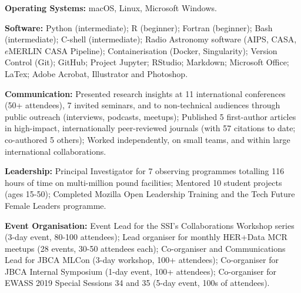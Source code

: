  \vspace{-8pt}
\begin{cvpubs}
  \cvpub
    {
      \begin{cvlist}
        \item{\textbf{Operating Systems:} macOS, Linux, Microsoft Windows.}
        \item {\textbf{Software:} Python (intermediate); R (beginner); Fortran (beginner); Bash (intermediate); C-shell (intermediate); Radio Astronomy software (AIPS, CASA, $e$MERLIN CASA Pipeline); Containerisation (Docker, Singularity); Version Control (Git); GitHub; Project Jupyter; RStudio; Markdown; Microsoft Office; LaTex; Adobe Acrobat, Illustrator and Photoshop.}
        \item {\textbf{Communication:} Presented research insights at 11 international conferences (50+ attendees), 7 invited seminars, and to non-technical audiences through public outreach (interviews, podcasts, meetups); Published 5 first-author articles in high-impact, internationally peer-reviewed journals (with 57 citations to date; co-authored 5 others); Worked independently, on small teams, and within large international collaborations.}
        \item {\textbf{Leadership:} Principal Investigator for 7 observing programmes totalling 116 hours of time on multi-million pound facilities; Mentored 10 student projects (ages 15-50); Completed Mozilla Open Leadership Training and the Tech Future Female Leaders programme.}
        \item {\textbf{Event Organisation:} Event Lead for the SSI's Collaborations Workshop series (3-day event, 80-100 attendees); Lead organiser for monthly HER+Data MCR meetups (28 events, 30-50 attendees each); Co-organiser and Communications Lead for JBCA MLCon (3-day workshop, 100+ attendees); Co-organiser for JBCA Internal Symposium (1-day event, 100+ attendees); Co-organiser for EWASS 2019 Special Sessions 34 and 35 (5-day event, 100s of attendees).}
      \end{cvlist}
    }
\end{cvpubs}